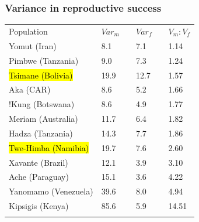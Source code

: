 \documentclass{beamer}
\makeatletter
\newcommand\SoulColor{%
  \let\set@color\beamerorig@set@color
  \let\reset@color\beamerorig@reset@color}
\makeatother
\begin{document}

\begin{frame}
\frametitle{Variance in reproductive success}

\begin{table}
\begin{tabular}{llllll}
\hline\noalign{\smallskip}
Population & $Var_{m}$ && $Var_{f}$ && $V_{m}:V_{f}$ \\
\noalign{\smallskip}\hline\noalign{\smallskip}
Yomut (Iran) & 8.1 && 7.1 && 1.14 \\
Pimbwe (Tanzania) & 9.0 && 7.3 && 1.24 \\
\SoulColor\hl{Tsimane (Bolivia)} & 19.9 && 12.7 && 1.57 \\
Aka (CAR) & 8.6 && 5.2 && 1.66 \\
!Kung (Botswana) & 8.6 && 4.9 && 1.77 \\
Meriam (Australia) & 11.7 && 6.4 && 1.82 \\
Hadza (Tanzania) & 14.3 && 7.7 && 1.86 \\
\SoulColor\hl{Twe-Himba (Namibia)} & 19.7 && 7.6 && 2.60 \\
Xavante (Brazil) & 12.1 && 3.9 && 3.10 \\
Ache (Paraguay) & 15.1 && 3.6 && 4.22 \\
Yanomamo (Venezuela) & 39.6 && 8.0 && 4.94 \\
Kipsigis (Kenya) & 85.6 && 5.9 && 14.51 \\
\noalign{\smallskip}\hline
\end{tabular}\par
\end{table}		


\end{frame}

\end{document}

